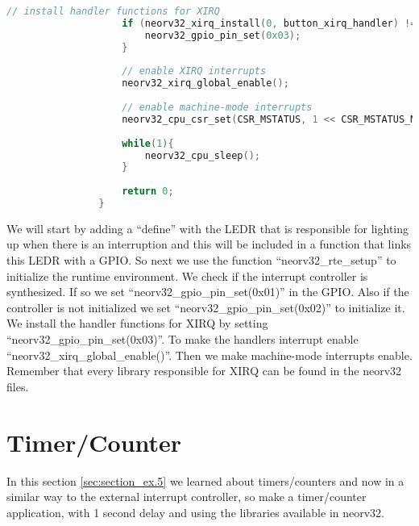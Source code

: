 \begin{lstlisting}[style=mystyle_c, language=c, breaklines]
                    // install handler functions for XIRQ 
                    if (neorv32_xirq_install(0, button_xirq_handler) != 0) {
                        neorv32_gpio_pin_set(0x03);
                    }
                
                    // enable XIRQ interrupts
                    neorv32_xirq_global_enable();
                
                    // enable machine-mode interrupts
                    neorv32_cpu_csr_set(CSR_MSTATUS, 1 << CSR_MSTATUS_MIE);
                
                    while(1){
                        neorv32_cpu_sleep();
                    }
                
                    return 0;
                }        
        \end{lstlisting}

        We will start by adding a ``define'' with the LEDR that is responsible for lighting up when there is an interruption and this will be included in a function that links this LEDR with a GPIO.
        So next we use the function ``neorv32\_rte\_setup'' to initialize the runtime environment. We check if the interrupt controller is synthesized. If so we set ``neorv32\_gpio\_pin\_set(0x01)'' in the GPIO.  Also if the controller is not initialized we set ``neorv32\_gpio\_pin\_set(0x02)'' to initialize it. We install the handler functions for XIRQ by setting ``neorv32\_gpio\_pin\_set(0x03)''. To make the handlers interrupt enable ``neorv32\_xirq\_global\_enable()''. Then we make machine-mode interrupts enable. 
        Remember that every library responsible for XIRQ can be found in the neorv32 files.
    
    \section{Timer/Counter} \label{sec:section_ex.5}

            In this section \autoref{sec:section_ex.5} we learned about timers/counters and now in a similar way to the external interrupt controller, so make a timer/counter application, with 1 second delay and using the libraries available in neorv32.

